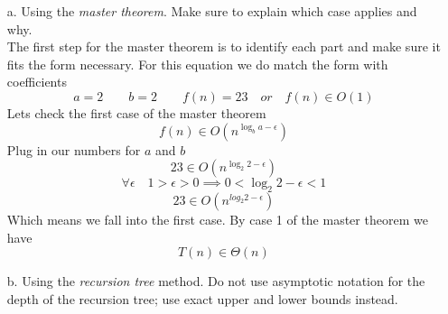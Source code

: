 \documentclass{article}
\begin{document}
\begin{itemize}
\item [a.] Using the \emph{master theorem}. Make sure to explain which case applies and why. \\
The first step for the master theorem is to identify each part and make sure it fits the form necessary.
For this equation we do match the form with coefficients
$$ a=2 \qquad b=2 \qquad f(n)=23 \quad or \quad f(n)\in O(1)$$
Lets check the first case of the master theorem
$$ f(n) \in O(n^{\log_{b}{a-\epsilon}}) $$
Plug in our numbers for $a$ and $b$
$$ 23 \in O(n^{\log_{2}{2-\epsilon}})$$
$$ \forall \epsilon \quad 1 > \epsilon > 0 \implies 0 < \log_{2}{2-\epsilon} < 1$$
$$23 \in O(n^{log_{2}{2-\epsilon}})$$
Which means we fall into the first case. By case 1 of the master theorem we have
$$ T(n) \in \Theta(n)$$


\item [b.] Using the \emph{recursion tree} method. Do not use asymptotic notation for the depth of the recursion tree; use exact upper and lower bounds instead. \\


\end{itemize}
\end{document}
